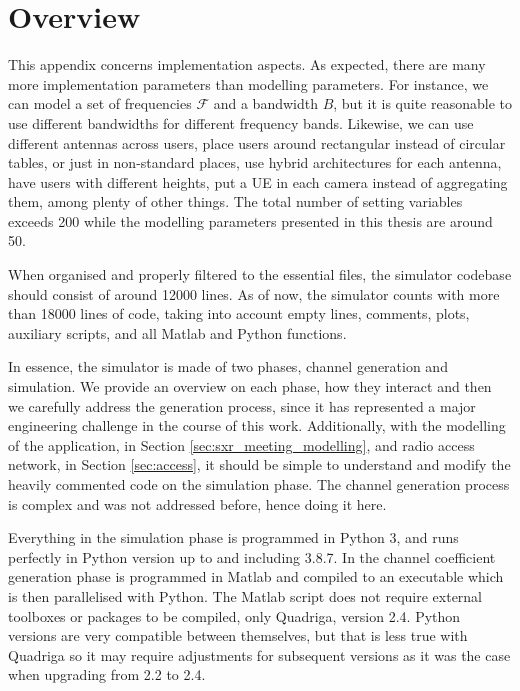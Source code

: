 \label{ap:implementation}


\section{Overview}
This appendix concerns implementation aspects. As expected, there are many more implementation parameters than modelling parameters. For instance, we can model a set of frequencies $\mathcal{F}$ and a bandwidth $B$, but it is quite reasonable to use different bandwidths for different frequency bands. Likewise, we can use different antennas across users, place users around rectangular instead of circular tables, or just in non-standard places, use hybrid architectures for each antenna, have users with different heights, put a UE in each camera instead of aggregating them, among plenty of other things. The total number of setting variables exceeds 200 while the modelling parameters presented in this thesis are around 50.

When organised and properly filtered to the essential files, the simulator codebase should consist of around 12000 lines. As of now, the simulator counts with more than 18000 lines of code, taking into account empty lines, comments, plots, auxiliary scripts, and all Matlab and Python functions. 

In essence, the simulator is made of two phases, channel generation and simulation. We provide an overview on each phase, how they interact and then we carefully address the generation process, since it has represented a major engineering challenge in the course of this work. Additionally, with the modelling of the application, in Section \ref{sec:sxr_meeting_modelling}, and radio access network, in Section \ref{sec:access}, it should be simple to understand and modify the heavily commented code on the simulation phase. The channel generation process is complex and was not addressed before, hence doing it here.

Everything in the simulation phase is programmed in Python 3, and runs perfectly in Python version up to and including 3.8.7. In the channel coefficient generation phase is programmed in Matlab and compiled to an executable which is then parallelised with Python. The Matlab script does not require external toolboxes or packages to be compiled, only Quadriga, version 2.4. Python versions are very compatible between themselves, but that is less true with Quadriga so it may require adjustments for subsequent versions as it was the case when upgrading from 2.2 to 2.4.

